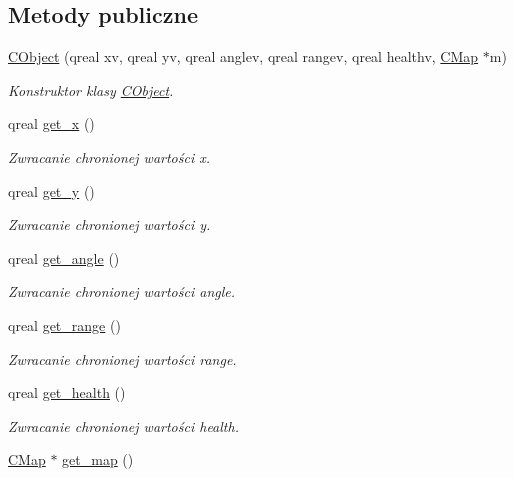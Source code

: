 \subsection*{Metody publiczne}
\begin{DoxyCompactItemize}
\item 
\mbox{\hyperlink{class_c_object_a97dbcf53f475041511e92c102bd18c87}{C\+Object}} (qreal xv, qreal yv, qreal anglev, qreal rangev, qreal healthv, \mbox{\hyperlink{class_c_map}{C\+Map}} $\ast$m)
\begin{DoxyCompactList}\small\item\em Konstruktor klasy \mbox{\hyperlink{class_c_object}{C\+Object}}. \end{DoxyCompactList}\item 
qreal \mbox{\hyperlink{class_c_object_aeb2157f241db131ecc1279eeb25f5790}{get\+\_\+x}} ()
\begin{DoxyCompactList}\small\item\em Zwracanie chronionej wartości x. \end{DoxyCompactList}\item 
qreal \mbox{\hyperlink{class_c_object_a0d35a19c161a897458a6077cbe756d7f}{get\+\_\+y}} ()
\begin{DoxyCompactList}\small\item\em Zwracanie chronionej wartości y. \end{DoxyCompactList}\item 
qreal \mbox{\hyperlink{class_c_object_acbd70cc733501b2a631e825aa4e8921f}{get\+\_\+angle}} ()
\begin{DoxyCompactList}\small\item\em Zwracanie chronionej wartości angle. \end{DoxyCompactList}\item 
qreal \mbox{\hyperlink{class_c_object_ae4d6cb4753f3ca0782158890160b7e18}{get\+\_\+range}} ()
\begin{DoxyCompactList}\small\item\em Zwracanie chronionej wartości range. \end{DoxyCompactList}\item 
qreal \mbox{\hyperlink{class_c_object_a1aa6f6ef73f37b17c0a7b94b78228192}{get\+\_\+health}} ()
\begin{DoxyCompactList}\small\item\em Zwracanie chronionej wartości health. \end{DoxyCompactList}\item 
\mbox{\hyperlink{class_c_map}{C\+Map}} $\ast$ \mbox{\hyperlink{class_c_object_ae357ff56797d1561a7c16c250b686747}{get\+\_\+map}} ()

\end{DoxyCompactItemize}
